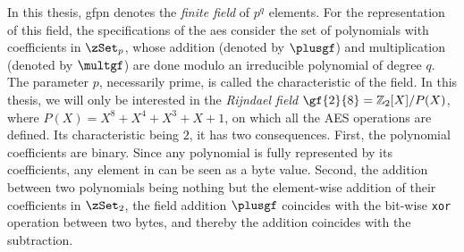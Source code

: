\label{sec:disc_math}
In this thesis, \gls{gfpn} denotes the \emph{finite field} of \(p^q\) elements.
For the representation of this field, the specifications of the \gls{aes} consider the set of polynomials with coefficients in \(\zSet_p\), whose addition (denoted by \(\plusgf\)) and multiplication (denoted by \(\multgf\)) are done modulo an irreducible polynomial of degree \(q\).
The parameter \(p\), necessarily prime, is called the \gls{characteristic} of the field.
In this thesis, we will only be interested in the \emph{Rijndael field} \(\gf{2}{8} = \mathbb{Z}_2[X] / P(X)\), where \(P(X) = X^8+X^4+X^3+X+1\), on which all the AES operations are defined.
Its \gls{characteristic} being \(2\), it has two consequences.
First, the polynomial coefficients are binary.
Since any polynomial is fully represented by its coefficients, any element in  can be seen as a byte value.
Second, the addition between two polynomials being nothing but the element-wise addition of their coefficients in \(\zSet_2\), the field addition \(\plusgf\) coincides with the bit-wise \verb+xor+ operation between two bytes, and thereby the addition coincides with the subtraction.